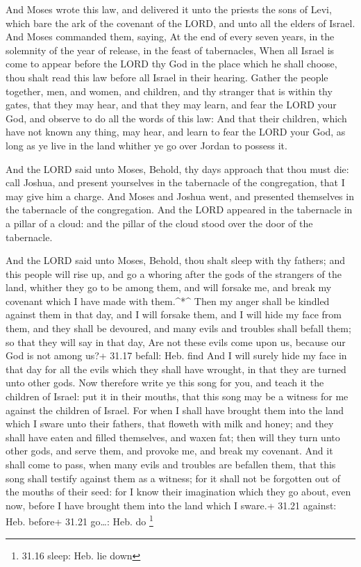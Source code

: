  And Moses wrote this law, and delivered it unto the priests
the sons of Levi, which bare the ark of the covenant of the LORD, and
unto all the elders of Israel.  And Moses commanded them,
saying, At the end of every seven years, in the solemnity of the year of
release, in the feast of tabernacles,  When all Israel is
come to appear before the LORD thy God in the place which he shall
choose, thou shalt read this law before all Israel in their hearing.
 Gather the people together, men, and women, and children,
and thy stranger that is within thy gates, that they may hear, and that
they may learn, and fear the LORD your God, and observe to do all the
words of this law:  And that their children, which have not
known any thing, may hear, and learn to fear the LORD your God, as long
as ye live in the land whither ye go over Jordan to possess it.

 And the LORD said unto Moses, Behold, thy days approach
that thou must die: call Joshua, and present yourselves in the
tabernacle of the congregation, that I may give him a charge. And Moses
and Joshua went, and presented themselves in the tabernacle of the
congregation.  And the LORD appeared in the tabernacle in a
pillar of a cloud: and the pillar of the cloud stood over the door of
the tabernacle.

 And the LORD said unto Moses, Behold, thou shalt sleep
with thy fathers; and this people will rise up, and go a whoring after
the gods of the strangers of the land, whither they go to be among them,
and will forsake me, and break my covenant which I have made with
them.\^{}*\^{}  Then my anger shall be kindled against them
in that day, and I will forsake them, and I will hide my face from them,
and they shall be devoured, and many evils and troubles shall befall
them; so that they will say in that day, Are not these evils come upon
us, because our God is not among us?+ 31.17 befall: Heb. find
 And I will surely hide my face in that day for all the
evils which they shall have wrought, in that they are turned unto other
gods.  Now therefore write ye this song for you, and teach
it the children of Israel: put it in their mouths, that this song may be
a witness for me against the children of Israel.  For when
I shall have brought them into the land which I sware unto their
fathers, that floweth with milk and honey; and they shall have eaten and
filled themselves, and waxen fat; then will they turn unto other gods,
and serve them, and provoke me, and break my covenant.  And
it shall come to pass, when many evils and troubles are befallen them,
that this song shall testify against them as a witness; for it shall not
be forgotten out of the mouths of their seed: for I know their
imagination which they go about, even now, before I have brought them
into the land which I sware.+ 31.21 against: Heb. before+ 31.21
go\ldots: Heb. do \footnote{31.16 sleep: Heb. lie down}

